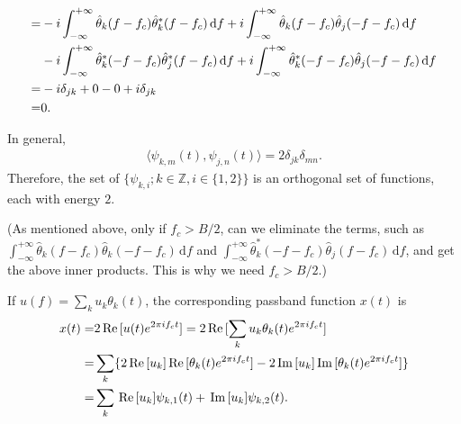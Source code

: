 \documentclass{assignment}
\begin{document}
\begin{sol}
\begin{itemize}
\begin{align}
            \notag=&-i\int_{-\infty}^{+\infty}\hat{\theta}_k(f-f_c)\hat{\theta}_k^*(f-f_c)\,\mathrm{d}f+i\int_{-\infty}^{+\infty}\hat{\theta}_k(f-f_c)\hat{\theta}_j(-f-f_c)\,\mathrm{d}f\\
            \notag&-i\int_{-\infty}^{+\infty}\hat{\theta}_k^*(-f-f_c)\hat{\theta}_j^*(f-f_c)\,\mathrm{d}f+i\int_{-\infty}^{+\infty}\hat{\theta}_k^*(-f-f_c)\hat{\theta}_j(-f-f_c)\,\mathrm{d}f\\
            \notag=&-i\delta_{jk}+0-0+i\delta_{jk}\\
            =&0.
        \end{align}
    \end{itemize}
    In general,
    \begin{align}
        \langle\psi_{k,m}(t),\psi_{j,n}(t)\rangle=2\delta_{jk}\delta_{mn}.
    \end{align}
    Therefore, the set of $\{\psi_{k,i};k\in\mathbb{Z},i\in\{1,2\}\}$ is an orthogonal set of functions, each with energy $2$.

    (As mentioned above, only if $f_c>B/2$, can we eliminate the terms, such as $\int_{-\infty}^{+\infty}\hat{\theta}_k(f-f_c)\hat{\theta}_k(-f-f_c)\,\mathrm{d}f$ and $\int_{-\infty}^{+\infty}\hat{\theta}_k^*(-f-f_c)\hat{\theta}_j(f-f_c)\,\mathrm{d}f$, and get the above inner products. This is why we need $f_c>B/2$.)

    If $u(f)=\sum_ku_k\theta_k(t)$, the corresponding passband function $x(t)$ is
    \begin{align}
        \notag x(t)=&2\,\text{Re}\,[u(t)e^{2\pi if_ct}]=2\,\text{Re}\,[\sum_ku_k\theta_k(t)e^{2\pi if_ct}]\\
        \notag=&\sum_k\{2\,\text{Re}\,[u_k]\,\text{Re}\,[\theta_k(t)e^{2\pi if_ct}]-2\,\text{Im}\,[u_k]\,\text{Im}\,[\theta_k(t)e^{2\pi if_ct}]\}\\
        =&\sum_k\,\text{Re}\,[u_k]\psi_{k,1}(t)+\,\text{Im}\,[u_k]\psi_{k,2}(t).
    \end{align}
\end{sol}
\end{document}
